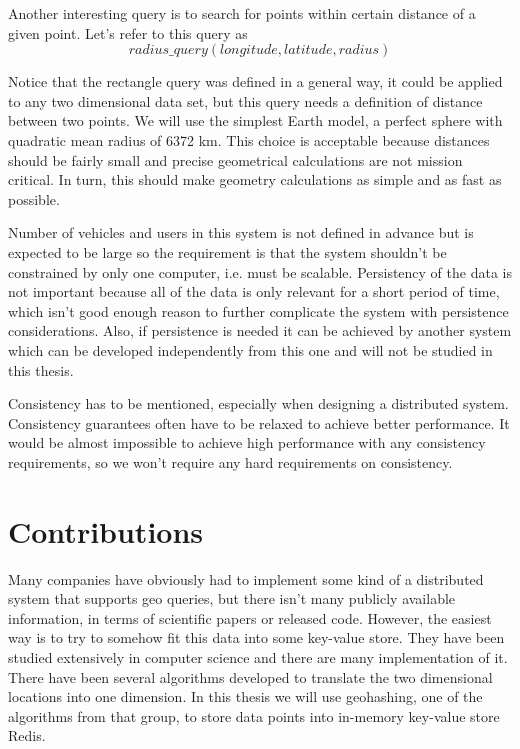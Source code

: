 \documentclass[times, utf8, diplomski]{fer}
\begin{document}
Another interesting query is to search for points within certain distance of a given point.  Let's refer to this query as
$$radius\_query (longitude, latitude, radius)$$

Notice that the rectangle query was defined in a general way, it could be applied to any two dimensional data set, but this query needs a definition of distance between two points. We will use the simplest Earth model, a perfect sphere with quadratic mean radius of 6372 km. This choice is acceptable because distances should be fairly small and precise geometrical calculations are not mission critical. In turn, this should make geometry calculations as simple and as fast as possible.

Number of vehicles and users in this system is not defined in advance but is expected to be large so the requirement is that the system shouldn't be constrained by only one computer, i.e. must be scalable. Persistency of the data is not important because all of the data is only relevant for a short period of time, which isn't good enough reason to further complicate the system with persistence considerations. Also, if persistence is needed it can be achieved by another system which can be developed independently from this one and will not be studied in this thesis. 

Consistency has to be mentioned, especially when designing a distributed system. Consistency guarantees often have to be relaxed to achieve better performance. It would be almost impossible to achieve high performance with any consistency requirements, so we won't require any hard requirements on consistency.

\section {Contributions}
Many companies have obviously had to implement some kind of a distributed system that supports geo queries, but there isn't many publicly available information, in terms of scientific papers or released code. However, the easiest way is to try to somehow fit this data into some key-value store. They have been studied extensively in computer science and there are many implementation of it. There have been several algorithms developed to translate the two dimensional locations into one dimension. In this thesis we will use geohashing, one of the algorithms from that group, to store data points into in-memory key-value store Redis.
\end{document}
